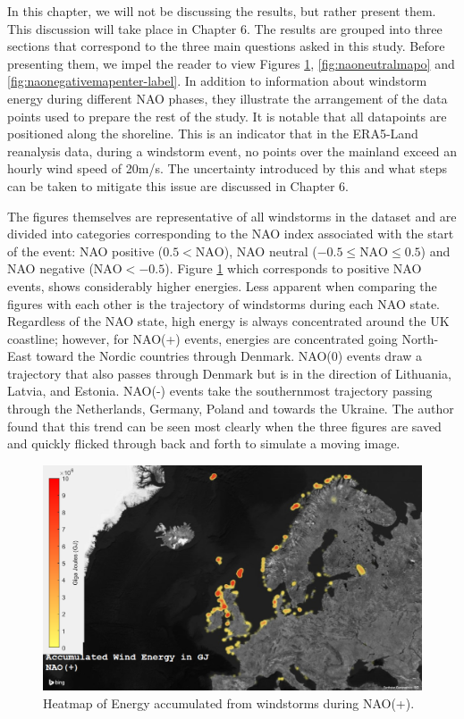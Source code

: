 In this chapter, we will not be discussing the results, but rather present them. This discussion will take place in Chapter 6. The results are grouped into three sections that correspond to the three main questions asked in this study. Before presenting them, we impel the reader to view Figures \ref{fig:naopostitivemap}, \ref{fig:naoneutralmapo} and \ref{fig:naonegativemapenter-label}. In addition to information about windstorm energy during different NAO phases, they illustrate the arrangement of the data points used to prepare the rest of the study. It is notable that all datapoints are positioned along the shoreline. This is an indicator that in the ERA5-Land reanalysis data, during a windstorm event, no points over the mainland exceed an hourly wind speed of 20m/s. The uncertainty introduced by this and what steps can be taken to mitigate this issue are discussed in Chapter 6.

The figures themselves are representative of all windstorms in the dataset and are divided into categories corresponding to the NAO index associated with the start of the event: NAO positive ($0.5 < \text{NAO}$), NAO neutral ($-0.5 \leq \text{NAO} \leq 0.5$) and NAO negative ($\text{NAO} < -0.5$). Figure \ref{fig:naopostitivemap} which corresponds to positive NAO events, shows considerably higher energies. Less apparent when comparing the figures with each other is the trajectory of windstorms during each NAO state. Regardless of the NAO state, high energy is always concentrated around the UK coastline; however, for NAO(+) events, energies are concentrated going North-East toward the Nordic countries through Denmark. NAO(0) events draw a trajectory that also passes through Denmark but is in the direction of Lithuania, Latvia, and Estonia. NAO(-) events take the southernmost trajectory passing through the Netherlands, Germany, Poland and towards the Ukraine. The author found that this trend can be seen most clearly when the three figures are saved and quickly flicked through back and forth to simulate a moving image. 

    \begin{figure}
        \centering
        \includegraphics[width=\textwidth]{figures/NAOPOsitive.png}
        \caption{Heatmap of Energy accumulated from windstorms during NAO(+).}
        \label{fig:naopostitivemap}
    \end{figure}

